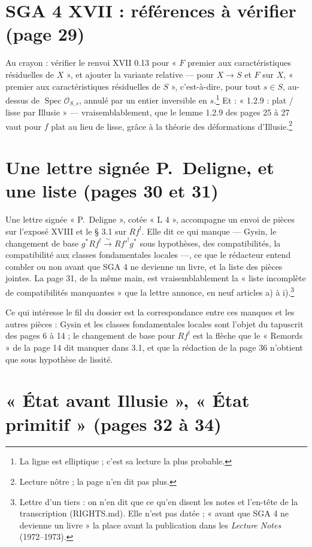 \documentclass[11pt,a4paper]{article}
\begin{document}
\section*{SGA 4 XVII : références à vérifier (page 29)}

Au crayon : vérifier le renvoi XVII 0.13 pour « $F$ premier aux
caractéristiques résiduelles de $X$ », et ajouter la variante relative --- pour
$X \to S$ et $F$ sur $X$, « premier aux caractéristiques résiduelles de
$S$ », c'est-à-dire, pour tout $s \in S$, au-dessus de
$\operatorname{Spec}\mathcal{O}_{S,s}$, annulé par un entier inversible en
$s$.\footnote{La ligne est elliptique ; c'est sa lecture la plus probable.}
Et : « 1.2.9 : plat / lisse par Illusie » --- vraisemblablement, que le
lemme 1.2.9 des pages 25 à 27 vaut pour $f$ plat au lieu de lisse, grâce à la
théorie des déformations d'Illusie.\footnote{Lecture nôtre ; la page n'en dit
pas plus.}

\section*{Une lettre signée P.~Deligne, et une liste (pages 30 et 31)}

Une lettre signée « P.~Deligne », cotée « L 4 », accompagne un envoi de pièces
sur l'exposé XVIII et le § 3.1 sur $Rf^!$. Elle dit ce qui manque --- Gysin,
le changement de base $g^*Rf^! \xrightarrow{\sim} Rf'^!g^*$ sous hypothèses,
des compatibilités, la compatibilité aux classes fondamentales locales ---,
ce que le rédacteur entend combler ou non avant que SGA 4 ne devienne un
livre, et la liste des pièces jointes. La page 31, de la même main, est
vraisemblablement la « liste incomplète de compatibilités manquantes » que la
lettre annonce, en neuf articles a) à i).\footnote{Lettre d'un tiers : on n'en
dit que ce qu'en disent les notes et l'en-tête de la transcription
(RIGHTS.md). Elle n'est pas datée ; « avant que SGA 4 ne devienne un livre »
la place avant la publication dans les \emph{Lecture Notes} (1972--1973).}

Ce qui intéresse le fil du dossier est la correspondance entre ces manques et
les autres pièces : Gysin et les classes fondamentales locales sont l'objet
du tapuscrit des pages 6 à 14 ; le changement de base pour $Rf^!$ est la
flèche que le « Remords » de la page 14 dit manquer dans 3.1, et que la
rédaction de la page 36 n'obtient que sous hypothèse de lissité.

\section*{« État avant Illusie », « État primitif » (pages 32 à 34)}
\end{document}
